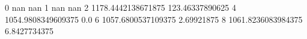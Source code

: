 0 nan nan
1 nan nan
2 1178.4442138671875 123.46337890625
4 1054.9808349609375 0.0
6 1057.6800537109375 2.69921875
8 1061.8236083984375 6.8427734375
